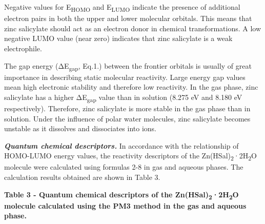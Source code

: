 Negative values for E\textsubscript{HOMO} and E\textsubscript{LUMO}
indicate the presence of additional electron pairs in both the upper and
lower molecular orbitals. This means that zinc salicylate should act as
an electron donor in chemical transformations. A low negative LUMO value
(near zero) indicates that zinc salicylate is a weak electrophile.

The gap energy (ΔE\textsubscript{gap}, Eq.1.) between the frontier
orbitals is usually of great importance in describing static molecular
reactivity. Large energy gap values \hspace{0pt}\hspace{0pt}mean high
electronic stability and therefore low reactivity. In the gas phase,
zinc salicylate has a higher ΔE\textsubscript{gap} value than in
solution (8.275 eV and 8.180 eV respectively). Therefore, zinc
salicylate is more stable in the gas phase than in solution. Under the
influence of polar water molecules, zinc salicylate becomes unstable as
it dissolves and dissociates into ions.

{\bfseries \emph{Quantum chemical descriptors.}} In accordance with the
relationship of HOMO-LUMO energy values, the reactivity descriptors of
the Zn(HSal)\textsubscript{2}·2H\textsubscript{2}O molecule were
calculated using formulas 2-8 in gas and aqueous phases. The calculation
results obtained are shown in Table 3.

{\bfseries Table 3 - Quantum chemical descriptors of the
Zn(HSal)\textsubscript{2}·2H\textsubscript{2}O molecule calculated using
the PM3 method in the gas and aqueous phase.}

